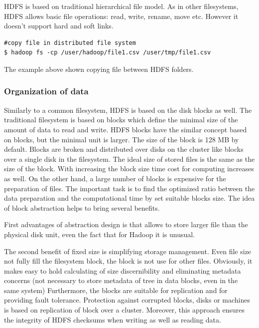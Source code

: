 \documentclass[a4paper,12pt,oneside]{report}
\begin{document}
HDFS is based on traditional hierarchical file model. As in other filesystems, HDFS allows basic file operations: 
read, write, rename, move etc. However it doesn’t support hard and soft links. 

\begin{footnotesize}
	\begin{lstlisting}[style=mybash]
#copy file in distributed file system
$ hadoop fs -cp /user/hadoop/file1.csv /user/tmp/file1.csv 
	\end{lstlisting}
\end{footnotesize} 
The example above shown copying file between HDFS folders. 


		\subsubsection{Organization of data}
Similarly to  a common filesystem, HDFS is based on the disk blocks as well. The traditional
filesystem is based on blocks which define the minimal size of the amount of data to read and write.
HDFS blocks have the similar concept based on blocks, but the minimal unit is
larger. The size of the block is 128 MB by default. Blocks are broken and distributed
over disks on the cluster like blocks over a single disk in the filesystem. The ideal 
size of stored files is the same as the size of the block. With increasing the block 
size time cost for computing increases as well. On the other hand, a large number
of blocks is expensive for the preparation of files. The important task is to find the optimized 
ratio between the data preparation and the computational time by set suitable blocks size.
The idea of block abstraction helps to bring several benefits.

 First advantages of
abstraction design is that allows to store larger file than the physical disk unit, 
even the fact that for Hadoop it is unusual.

The second benefit of fixed size is simplifying storage management. Even file size not fully fill the filesystem block, the block is not use for other files.  Obviously, it makes easy 
to hold calculating of size discernibility and eliminating metadata concerns (not necessary 
to store metadata of tree in data blocks, even in the same system)
Furthermore, the blocks are suitable for replication and for providing fault tolerance. Protection
against corrupted blocks, disks or machines is based on replication of block over a cluster. 
Moreover, this approach ensures the integrity of HDFS checksums when writing as well as reading data.
\end{document}
